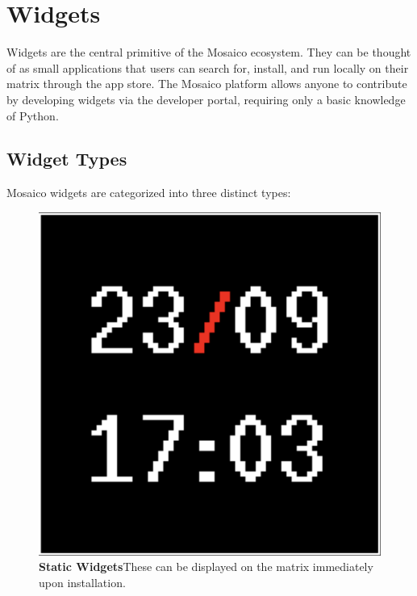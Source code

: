 \section{Widgets}
Widgets are the central primitive of the Mosaico ecosystem. They can be thought of as small applications that users can search for, install, and run locally on their matrix through the app store. The Mosaico platform allows anyone to contribute by developing widgets via the developer portal, requiring only a basic knowledge of Python.

\subsection{Widget Types}
Mosaico widgets are categorized into three distinct types:
\label{widget-types}
\begin{figure}[h]
    \centering
    \begin{minipage}[b]{0.32\textwidth}
        \centering
        \includegraphics[width=\textwidth]{tesi/img/stylized_widgets/datetime.png}
        \caption*{\textbf{Static Widgets}\newline These can be displayed on the matrix immediately upon installation.}
    \end{minipage}
    \begin{minipage}[b]{0.32\textwidth}
        \centering

\end{minipage}
\end{figure}
